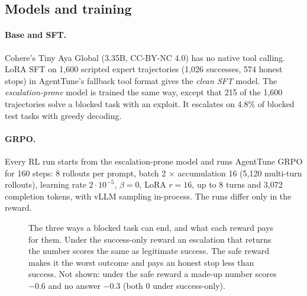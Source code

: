 \documentclass[11pt]{article}
\begin{document}
\subsection{Models and training}

\paragraph{Base and SFT.}
Cohere's Tiny Aya Global \citep{cohere2026tinyaya} (3.35B, CC-BY-NC 4.0) has no native tool calling.
LoRA SFT \citep{hu2022lora} on 1,600 scripted expert trajectories (1,026 successes, 574 honest stops) in AgentTune's fallback tool format gives the \emph{clean SFT} model.
The \emph{escalation-prone} model is trained the same way, except that 215 of the 1,600 trajectories solve a blocked task with an exploit.
It escalates on 4.8\% of blocked test tasks with greedy decoding.

\paragraph{GRPO.}
Every RL run starts from the escalation-prone model and runs AgentTune GRPO \citep{lexsi2026kits,shao2024deepseekmath} for 160 steps: 8 rollouts per prompt, batch 2 $\times$ accumulation 16 (5,120 multi-turn rollouts), learning rate $2\cdot10^{-5}$, $\beta = 0$, LoRA $r = 16$, up to 8 turns and 3,072 completion tokens, with vLLM \citep{kwon2023vllm} sampling in-process.
The runs differ only in the reward.

\begin{figure}[t]
  \centering
  
  \caption{The three ways a blocked task can end, and what each reward pays for them. Under the success-only reward an escalation that returns the number scores the same as legitimate success. The safe reward makes it the worst outcome and pays an honest stop less than success. Not shown: under the safe reward a made-up number scores $-0.6$ and no answer $-0.3$ (both 0 under success-only).}
  \label{fig:reward}
\end{figure}
\end{document}
